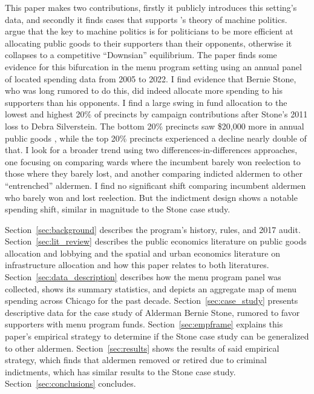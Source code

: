 This paper makes two contributions, firstly it publicly introduces this setting's data, and secondly it finds cases that supports \cite{dixit_londregan1996}'s theory of machine politics.
\cite{dixit_londregan1996} argue that the key to machine politics is for politicians to be more efficient at allocating public goods to their supporters than their opponents, otherwise it collapses to a competitive ``Downsian'' equilibrium.
The paper finds some evidence for this bifurcation in the menu program setting using an annual panel of located spending data from 2005 to 2022.
I find evidence that Bernie Stone, who was long rumored to do this, did indeed allocate more spending to his supporters than his opponents.
I find a large swing in fund allocation to the lowest and highest 20\% of precincts by campaign contributions after Stone's 2011 loss to Debra Silverstein. 
The bottom 20\% precincts saw \$20,000 more in annual public goods , while the top 20\% precincts experienced a decline nearly double of that.
I look for a broader trend using two differences-in-differences approaches, one focusing on comparing wards where the incumbent barely won reelection to those where they barely lost, and another comparing indicted aldermen to other ``entrenched'' aldermen.
I find no significant shift comparing incumbent aldermen who barely won and lost reelection.
But the indictment design shows a notable spending shift, similar in magnitude to the Stone case study.



Section~\ref{sec:background} describes the program's history, rules, and 2017 audit.
Section~\ref{sec:lit_review} describes the public economics literature on public goods allocation and lobbying and the spatial and urban economics literature on infrastructure allocation and how this paper relates to both literatures.
Section~\ref{sec:data_description} describes how the menu program panel was collected, shows its summary statistics, and depicts an aggregate map of menu spending across Chicago for the past decade.
Section~\ref{sec:case_study} presents descriptive data for the case study of Alderman Bernie Stone, rumored to favor supporters with menu program funds. 
Section~\ref{sec:empframe} explains this paper's empirical strategy to determine if the Stone case study can be generalized to other aldermen.
Section~\ref{sec:results} shows the results of said empirical strategy, which finds that aldermen removed or retired due to criminal indictments, which has similar results to the Stone case study. 
Section~\ref{sec:conclusions} concludes.


